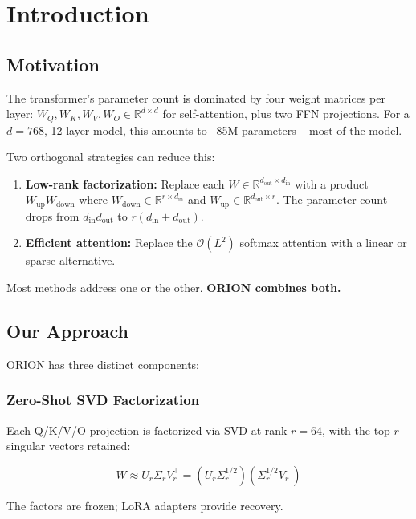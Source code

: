 
\section{Introduction}

\subsection{Motivation}

The transformer's parameter count is dominated by four weight matrices 
per layer: $W_Q, W_K, W_V, W_O \in \mathbb{R}^{d \times d}$ for self-attention, 
plus two FFN projections. For a $d = 768$, 12-layer model, this amounts 
to ~85M parameters -- most of the model.

Two orthogonal strategies can reduce this:

\begin{enumerate}
\item \textbf{Low-rank factorization:} Replace each $W \in \mathbb{R}^{d_\text{out} \times d_\text{in}}$
  with a product $W_\text{up} W_\text{down}$ where $W_\text{down} \in \mathbb{R}^{r \times d_\text{in}}$
  and $W_\text{up} \in \mathbb{R}^{d_\text{out} \times r}$. The parameter
  count drops from $d_\text{in} d_\text{out}$ to $r(d_\text{in} + d_\text{out})$.

\item \textbf{Efficient attention:} Replace the $\mathcal{O}(L^2)$ softmax attention
  with a linear or sparse alternative.

\end{enumerate}
Most methods address one or the other. \textbf{ORION combines both.}

\subsection{Our Approach}

ORION has three distinct components:

\subsubsection{Zero-Shot SVD Factorization}

Each Q/K/V/O projection is factorized via SVD at rank $r = 64$, with 
the top-$r$ singular vectors retained:

\[
W \approx U_r \Sigma_r V_r^\top = (U_r \Sigma_r^{1/2})(\Sigma_r^{1/2} V_r^\top)
\]

The factors are frozen; LoRA adapters provide recovery.

